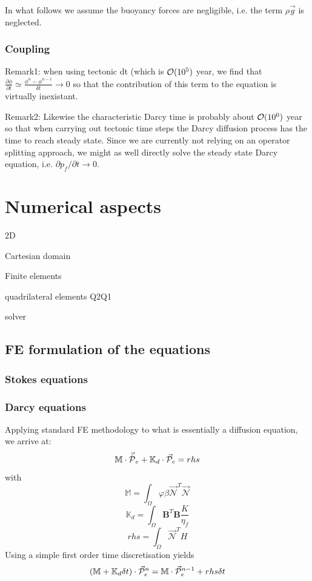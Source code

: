 \documentclass[a4paper]{article}
\newcommand{\K}{{\mathbb{K}}}
\newcommand{\M}{{\mathbb{M}}}
\newcommand{\bN}{{\mathcal{N}}}
\begin{document}
\todo[inline]{}


In what follows we assume the buoyancy forces are negligible, i.e. 
the term $\rho \vec{g}$ is neglected.


\subsubsection{Coupling}

Remark1: 
when using tectonic dt (which is ${\cal{O}}(10^5)$ year, 
we find that $\frac{\partial \phi}{\partial t}
\simeq \frac{\phi^n -\phi^{n-1}}{\delta t } \rightarrow 0$
so that the contribution of this term to the equation is 
virtually inexistant.

Remark2: Likewise the characteristic Darcy time is probably 
about ${\cal{O}}(10^0)$ year so that when carrying out 
tectonic time steps the Darcy diffusion process has the time 
to reach steady state. Since we are currently not
relying on an operator splitting approach, we might as well
directly solve the steady state Darcy equation, i.e.
$\partial p_f/\partial t \rightarrow 0$. 




\newpage
\section{Numerical aspects}

2D

Cartesian domain

Finite elements

quadrilateral elements Q2Q1

solver

\subsection{FE formulation of the equations}


\subsubsection{Stokes equations}


\subsubsection{Darcy equations}
Applying standard FE methodology to what is essentially a diffusion equation, we arrive at:
\[
{\M} \cdot {\vec{\dot{\cal{P}}}}_e  + {\K}_d \cdot \vec{\cal P}_e = rhs
\]
with
\[
{\M} = \int_\Omega \varphi \beta \vec{\bN}^T \vec{\bN} 
\]
\[
\K_d = \int_\Omega {\bm B}^T {\bm B} \frac{K}{\eta_f} 
\]
\[
rhs = \int_\Omega \vec\bN^T  H 
\]
Using a simple first order time discretisation yields
\[
({\M} + {\K}_d \delta t) \cdot \vec{\cal P}_e^n = \M \cdot \vec{\cal P}_e^{n-1} + rhs \delta t
\]
\end{document}
